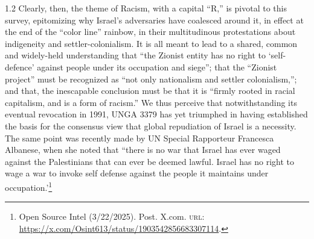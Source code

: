 \documentclass[../unravbook.tex]{subfiles}
\begin{document}
\begin{spacing}{1.2}
Clearly, then, the theme of Racism, with a capital ``R,'' is pivotal to this survey, epitomizing why Israel's adversaries have coalesced around it, in effect at the end of the ``color line'' rainbow, in their multitudinous protestations about indigeneity and settler-colonialism. It is all meant to lead to a shared, common and widely-held understanding that ``the Zionist entity has no right to `self-defence' against people under its occupation and siege''; that the ``Zionist project'' must be recognized as ``not only nationalism and settler colonialism,''; and that, the inescapable conclusion must be that it is ``firmly rooted in racial capitalism, and is a form of racism.'' We thus perceive that notwithstanding its eventual revocation in 1991, UNGA 3379 has yet triumphed in having established the basis for the consensus view that global repudiation of Israel is a necessity. The same point was recently made by UN Special Rapporteur Francesca Albanese, when she noted that ``there is no war that Israel has ever waged against the Palestinians that can ever be deemed lawful. Israel has no right to wage a war to invoke self defense against the people it maintains under occupation.'\footnote{Open Source Intel (3/22/2025). Post. X.com. \textsc{url: } \url{https://x.com/Osint613/status/1903542856683307114}.}


\end{spacing}
\end{document}
